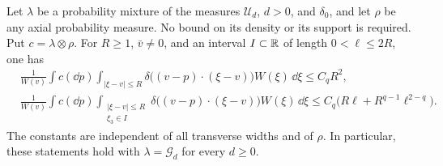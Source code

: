 \begin{lemma}
\label{ker:geometric-slice}
Let $\lambda$ be a probability mixture of the measures
$\mathcal U_d$, $d>0$, and $\delta_0$, and let $\rho$ be any axial
probability measure. No bound on its density or its support is
required. Put $c=\lambda\otimes\rho$. For $R\geq1$, $\bar v\ne0$,
and an interval $I\subset\mathbb R$ of length $0<\ell\leq2R$, one has
\begin{align}
 &\frac{1}{W(v)}\int c(\dd p)
   \int_{|\xi-v|\leq R}
    \delta\bigl((v-p)\cdot(\xi-v)\bigr)W(\xi)\,\dd\xi
     \leq C_q R^2,\label{ker:geometric-total}\\
 &\frac{1}{W(v)}\int c(\dd p)
   \int_{\substack{|\xi-v|\leq R\\ \xi_3\in I}}
    \delta\bigl((v-p)\cdot(\xi-v)\bigr)W(\xi)\,\dd\xi
     \leq C_q\bigl(R\ell+R^{q-1}\ell^{2-q}\bigr).
     \label{ker:geometric-interval}
\end{align}
The constants are independent of all transverse widths and of $\rho$.
In particular, these statements hold with $\lambda=\mathcal G_d$ for
every $d\geq0$.
\end{lemma}

